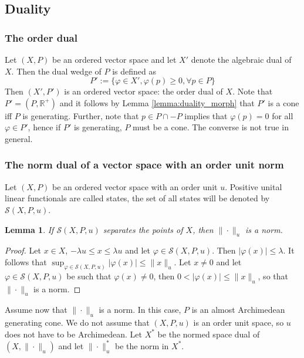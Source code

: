 \documentclass[12pt]{article}
\newtheorem{lemma}{Lemma}
\theoremstyle{remark}
\newcommand{\<}{\langle}
\begin{document}



\subsection{Duality}
\subsubsection*{The order dual}

Let $(X,P)$ be an ordered vector space and let $X'$ denote the algebraic dual of $X$. Then the dual wedge of $P$ is defined as
\[
P':=\{\varphi\in X', \varphi(p)\ge 0, \forall p\in P\}
\]
Then $(X',P')$ is an ordered vector space: the order dual of $X$. Note that  $P'=(P,\mathbb R^+)$ and it follows by  Lemma \ref{lemma:duality_morph} that 
	$P'$ is a cone iff $P$ is generating. Further, note that $p\in P\cap -P$ implies that $\varphi(p)=0$ for all $\varphi\in P'$, hence if $P'$ is generating, $P$ must be a cone. The converse is not true in general.


\subsubsection*{The norm dual of a vector space with an order unit norm} 


Let $(X,P)$ be an ordered vector space with an order unit $u$. Positive unital linear functionals are called states, the set of all 
 states will be denoted by $\mathcal S(X,P,u)$.

\begin{lemma}\label{lemma:separates}
 If  $\mathcal S(X,P,u)$ separates the points of $X$, then $\|\cdot\|_u$ is a norm.

\end{lemma}

\begin{proof}
Let $x\in X$, $-\lambda u\le x\le \lambda u$ and let $\varphi\in \mathcal S(X,P,u)$. Then $|\varphi(x)|\le \lambda$. It follows that 
$\sup_{\varphi\in \mathcal S(X,P,u)} |\varphi(x)|\le \|x\|_u$. Let $x\neq 0$ and let $\varphi\in  \mathcal S(X,P,u)$ be such that 
$\varphi(x)\ne 0$, then $0<|\varphi(x)|\le \|x\|_u$, so that $\|\cdot\|_u$ is a norm.


\end{proof}



Assume now that $\|\cdot \|_u$ is a norm. In this case,  $P$ is an almost Archimedean generating  cone. We do not assume that $(X,P,u)$ is an order unit space, so $u$ does not have to be Archimedean. 
Let $X^*$ be the normed space dual of $(X, \|\cdot\|_u)$ and let $\|\cdot\|_u^*$ be the norm in $X^*$. 
\end{document}
